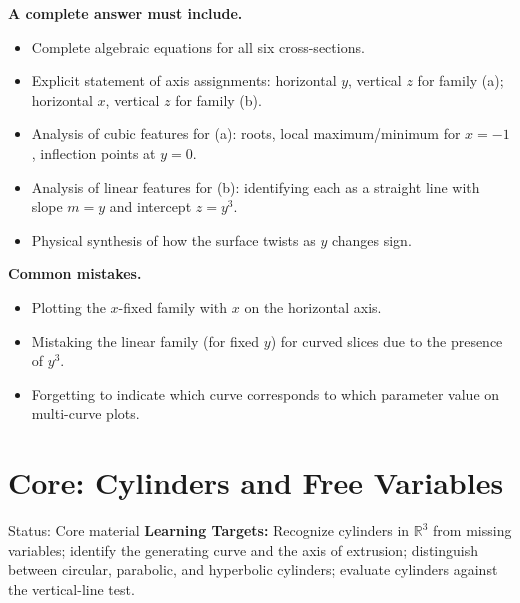 \documentclass[11pt,letterpaper]{article}
\newcommand{\R}{\mathbb{R}}
\begin{document}
\textbf{A complete answer must include.}
\begin{itemize}[leftmargin=*,nosep]
    \item Complete algebraic equations for all six cross-sections.
    \item Explicit statement of axis assignments: horizontal $y$, vertical $z$ for family (a); horizontal $x$, vertical $z$ for family (b).
    \item Analysis of cubic features for (a): roots, local maximum/minimum for $x=-1$, inflection points at $y=0$.
    \item Analysis of linear features for (b): identifying each as a straight line with slope $m = y$ and intercept $z = y^3$.
    \item Physical synthesis of how the surface twists as $y$ changes sign.
\end{itemize}

\textbf{Common mistakes.}
\begin{itemize}[leftmargin=*,nosep]
    \item Plotting the $x$-fixed family with $x$ on the horizontal axis.
    \item Mistaking the linear family (for fixed $y$) for curved slices due to the presence of $y^3$.
    \item Forgetting to indicate which curve corresponds to which parameter value on multi-curve plots.
\end{itemize}

\clearpage

\section{Core: Cylinders and Free Variables}\label{sec:cylinders}
\begin{statusbox}{Status: Core material}
\textbf{Learning Targets:} Recognize cylinders in $\R^3$ from missing variables; identify the generating curve and the axis of extrusion; distinguish between circular, parabolic, and hyperbolic cylinders; evaluate cylinders against the vertical-line test.
\end{statusbox}
\end{document}
